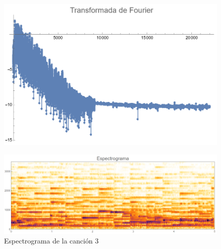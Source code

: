 \documentclass[12pt, letterpaper]{article}
\begin{document}
\begin{figure}[H]
  \centering
  \begin{minipage}{.4\linewidth}
    \centering
    \includegraphics[width=\linewidth]{imgs/Cancion3/transformada.png}
    \label{fig:03a}
  \end{minipage}
  \begin{minipage}{0.07\textwidth}\end{minipage}
  \begin{minipage}{.47\linewidth}
    \centering
    \includegraphics[width=\linewidth]{imgs/Cancion3/espectrograma.png}
    \caption{Espectrograma de la canción 3}
    \label{fig:03i}
  \end{minipage}
\end{figure}
\end{document}
